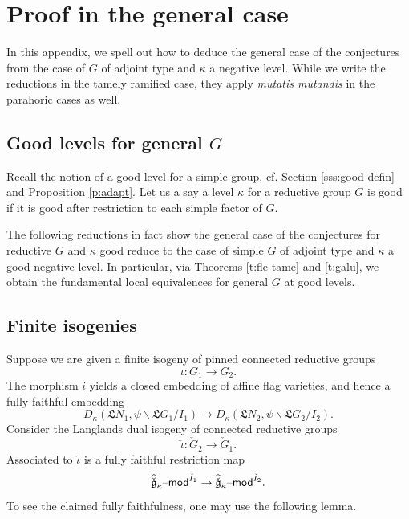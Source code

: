 \documentclass[11pt,reqno]{amsart}
\newcommand{\cgk}{\widehat{\check{\mathfrak{g}}}_{\check{\kappa}}}
\newcommand{\fL}{\mathfrak{L}}
\theoremstyle{remark}
\numberwithin{equation}{section}
\renewcommand{\mod}{\text{\textendash}\mathsf{mod}}
\begin{document}
\appendix









\section{Proof in the general case} \label{a:reduc}


In this appendix, we spell out how to deduce the general case of the 
conjectures from the case of $G$ of adjoint type and $\kappa$ a negative 
level. While we write the reductions in the tamely ramified case, they apply 
{\em mutatis mutandis} in the parahoric cases as well.  


\subsection{Good levels for general $G$} Recall the notion of a good level for 
a simple group, cf. Section \ref{sss:good-defin} and Proposition \ref{p:adapt}. 
Let us a say a level $\kappa$ for a reductive group $G$ is good if it is good 
after restriction to each simple factor of $G$. 


The following reductions in 
fact show the general case of the conjectures for reductive $G$ and $\kappa$ 
good reduce to the case of simple $G$ of adjoint type and $\kappa$ a good 
negative 
level. In particular, via Theorems \ref{t:fle-tame} and \ref{t:galu}, we obtain 
the fundamental local equivalences for general $G$ at good levels. 







\subsection{Finite isogenies} \label{ss:isog} Suppose we are given a finite 
isogeny of 
pinned connected reductive groups \[\iota: G_1 \rightarrow G_2.\]The morphism 
$i$ 
yields a closed embedding of 
affine flag varieties, and hence 
a fully faithful embedding
%
\begin{equation}
\label{e:ewhit}D_\kappa( \mathfrak{L}N_1, \psi \backslash \fL G_1 / 
I_1) 
\rightarrow D_\kappa(\mathfrak{L}N_2, \psi \backslash \fL G_2 / I_2).
\end{equation}
%
Consider the Langlands dual isogeny of connected reductive groups 
\[\check{\iota}: 
\check{G}_2 \rightarrow 
\check{G}_1.\] Associated to $\check{\iota}$ is a fully faithful restriction 
map 
%
\begin{equation} \label{e:ecato}
\cgk\mod^{\check{I}_1} \rightarrow \cgk\mod^{\check{I}_2}.
\end{equation}
To see the claimed fully faithfulness, one may use the following lemma. 
\end{document}
